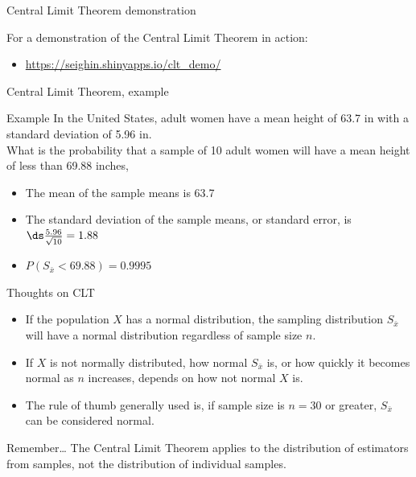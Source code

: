 \documentclass[xcolor=table, handout]{beamer}
\begin{document}
\begin{frame}{Central Limit Theorem demonstration}
\begin{block}{}
\large
For a demonstration of the Central Limit Theorem in action:
\begin{itemize}
\item \url{https://seighin.shinyapps.io/clt_demo/}
\end{itemize}
\end{block}
\end{frame}

\begin{frame}{Central Limit Theorem, example}
\begin{exampleblock}{Example}
\large
In the United States, adult women have a mean height of 63.7 in with a standard deviation of 5.96 in. \\
\medskip
What is the probability that a sample of 10 adult women will have a mean height of less than 69.88 inches,
\begin{itemize}
\pause\item The mean of the sample means is 63.7
\pause\item The standard deviation of the sample means, or standard error, is $\ds \frac {5.96}{\sqrt{10}} = 1.88$  
\pause\item $P(S_{\bar x} < 69.88) = 0.9995$
\end{itemize}
\end{exampleblock}

\end{frame}

\begin{frame}{Thoughts on CLT}
\begin{block}{}
\large
\begin{itemize}
\item If the population $X$ has a normal distribution, the sampling distribution $S_{\bar x}$ will have a normal distribution regardless of sample size $n$.
\pause\item If $X$ is not normally distributed, how normal $S_{\bar x}$ is, or how quickly it becomes normal as $n$ increases, depends on how not normal $X$ is.
\pause\item The rule of thumb generally used is, if sample size is $n=30$ or greater, $S_{\bar x}$ can be considered normal.
\end{itemize}

\end{block}

\pause
\begin{alertblock}{Remember\ldots}
The Central Limit Theorem applies to the distribution of estimators from samples, not the distribution of individual samples.
\end{alertblock}
\end{frame}
\end{document}
